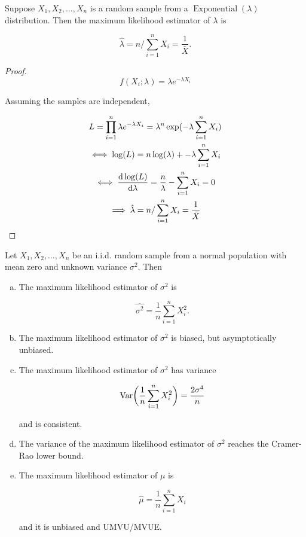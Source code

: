 \begin{proposition} Suppose \(X_1, X_2, \ldots, X_n\) is a random sample from a \(\operatorname{Exponential}(\lambda)\) distribution. Then the maximum likelihood estimator of \(\lambda\) is

\[
\hat{\lambda} = n / \sum_{i=1}^n X_i = \frac{1}{\bar{X}}.
\]

\end{proposition}

\begin{proof}

\[
f(X_i; \lambda) = \lambda e^{-\lambda X_i}
\]

Assuming the samples are independent,

\begin{multline*}
L = \prod_{i=1}^n \lambda e^{-\lambda X_i} = \lambda^n \exp(-\lambda \sum_{i=1}^n X_i)
\\ \iff \log(L) = n \log(\lambda) + -\lambda \sum_{i=1}^n X_i
\\ \iff \deriv{\log(L)}{\lambda} = \frac{n}{\lambda} - \sum_{i=1}^n X_i = 0
\\ \implies 
\hat{\lambda} = n / \sum_{i=1}^n X_i = \frac{1}{\bar{X}}
\end{multline*}


\end{proof}

\begin{proposition} Let \(X_1, X_2, \ldots, X_n\) be an i.i.d. random sample from a normal population with mean zero and unknown variance \(\sigma^2\). Then

\begin{enumerate}[(a)]

\item The maximum likelihood estimator of \(\sigma^2\) is

\[
\hat{\sigma^2} = \frac{1}{n} \sum_{i=1}^n X_i^2.
\]

\item The maximum likelihood estimator of \(\sigma^2\) is biased, but asymptotically unbiased.

\item The maximum likelihood estimator of \(\sigma^2\) has variance

\[
\Var \bigg( \frac{1}{n} \sum_{i=1}^n X_i^2 \bigg)  =  \frac{2 \sigma^4}{n}
\]

and is consistent.

\item The variance of the maximum likelihood estimator of \(\sigma^2\) reaches the Cramer-Rao lower bound.

\item The maximum likelihood estimator of \(\mu\) is

\[
\hat{\mu} = \frac{1}{n} \sum_{i=1}^n X_i
\]

and it is unbiased and UMVU/MVUE.

\end{enumerate}

\end{proposition}

